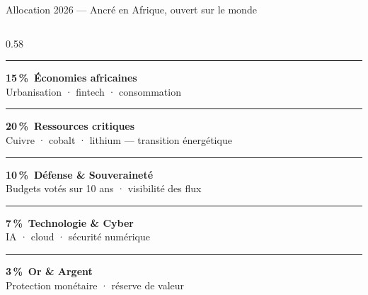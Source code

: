 \documentclass[aspectratio=169,9pt]{beamer}
\begin{document}
\begin{frame}{Allocation 2026 — Ancré en Afrique, ouvert sur le monde}
\begin{columns}[T,totalwidth=\textwidth]
\begin{column}{0.58\textwidth}
{\color{steel!75}\rule{7pt}{7pt}}\enspace
  {\small\bfseries\color{navy}15\,\%\ Économies africaines}\\[-1pt]
{\tiny\color{coal!70}\hspace{10pt}Urbanisation · fintech · consommation}\\[4pt]

{\color{steel!45}\rule{7pt}{7pt}}\enspace
  {\small\bfseries\color{navy}20\,\%\ Ressources critiques}\\[-1pt]
{\tiny\color{coal!70}\hspace{10pt}Cuivre · cobalt · lithium — transition énergétique}\\[4pt]

{\color{coal!70}\rule{7pt}{7pt}}\enspace
  {\small\bfseries\color{navy}10\,\%\ Défense \& Souveraineté}\\[-1pt]
{\tiny\color{coal!70}\hspace{10pt}Budgets votés sur 10 ans · visibilité des flux}\\[4pt]

{\color{coal!40}\rule{7pt}{7pt}}\enspace
  {\small\bfseries\color{navy}7\,\%\ Technologie \& Cyber}\\[-1pt]
{\tiny\color{coal!70}\hspace{10pt}IA · cloud · sécurité numérique}\\[4pt]

{\color{steel!20}\rule{7pt}{7pt}}\enspace
  {\small\bfseries\color{navy}3\,\%\ Or \& Argent}\\[-1pt]
{\tiny\color{coal!70}\hspace{10pt}Protection monétaire · réserve de valeur}\\[5pt]


\end{column}
\end{columns}
\end{frame}
\end{document}
